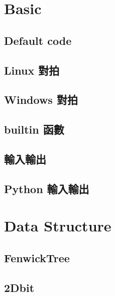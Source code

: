 \documentclass[a4paper,10pt,twocolumn,oneside]{article}
\begin{document}
\pagestyle{fancy}
\fancyfoot{}
\fancyhead[R]{\thepage}
\renewcommand{\headrulewidth}{0.4pt}
\renewcommand{\contentsname}{Contents} 

\scriptsize
\tableofcontents
\section{Basic}
\subsection{Default code}

\subsection{Linux 對拍}

\subsection{Windows 對拍}

\subsection{builtin 函數}

\subsection{輸入輸出}

\subsection{Python 輸入輸出}


\section{Data Structure}
%
\subsection{FenwickTree}

\subsection{2Dbit}

\end{document}
